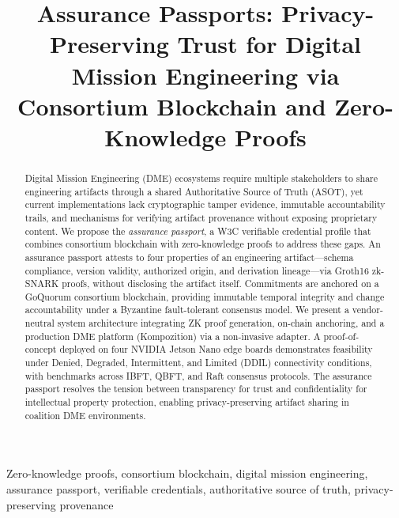 \documentclass[journal]{IEEEtran}
\title{Assurance Passports: Privacy-Preserving Trust for Digital Mission Engineering via Consortium Blockchain and Zero-Knowledge Proofs}
\author{
  \IEEEauthorblockN{Nishant Jagannath}
  \IEEEauthorblockA{
    University of Canberra\\
    Canberra, Australia\\
    nishant.jagannath@canberra.edu.au
  }
}
\begin{document}
\maketitle

\begin{abstract}
Digital Mission Engineering (DME) ecosystems require multiple stakeholders to share engineering artifacts through a shared Authoritative Source of Truth (ASOT), yet current implementations lack cryptographic tamper evidence, immutable accountability trails, and mechanisms for verifying artifact provenance without exposing proprietary content.
We propose the \emph{assurance passport}, a W3C verifiable credential profile that combines consortium blockchain with zero-knowledge proofs to address these gaps.
An assurance passport attests to four properties of an engineering artifact---schema compliance, version validity, authorized origin, and derivation lineage---via Groth16 zk-SNARK proofs, without disclosing the artifact itself.
Commitments are anchored on a GoQuorum consortium blockchain, providing immutable temporal integrity and change accountability under a Byzantine fault-tolerant consensus model.
We present a vendor-neutral system architecture integrating ZK proof generation, on-chain anchoring, and a production DME platform (Kompozition) via a non-invasive adapter.
A proof-of-concept deployed on four NVIDIA Jetson Nano edge boards demonstrates feasibility under Denied, Degraded, Intermittent, and Limited (DDIL) connectivity conditions, with benchmarks across IBFT, QBFT, and Raft consensus protocols.
The assurance passport resolves the tension between transparency for trust and confidentiality for intellectual property protection, enabling privacy-preserving artifact sharing in coalition DME environments.
\end{abstract}

\begin{IEEEkeywords}
Zero-knowledge proofs, consortium blockchain, digital mission engineering, assurance passport, verifiable credentials, authoritative source of truth, privacy-preserving provenance
\end{IEEEkeywords}





















\end{document}
